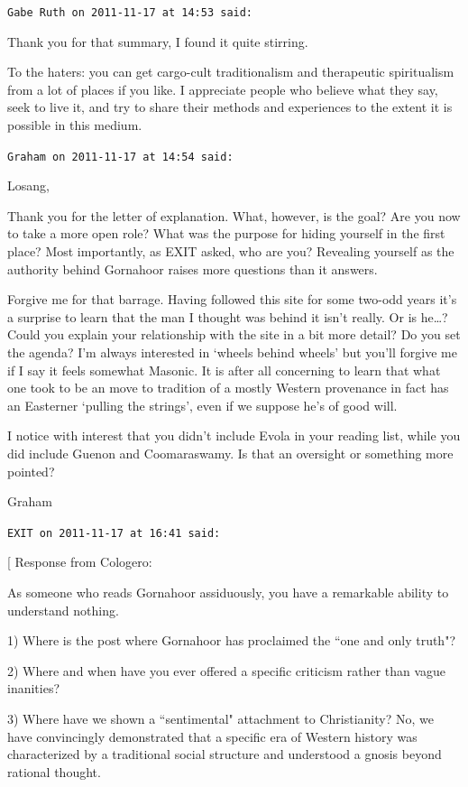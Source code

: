 \begin{footnotesize}
\begin{sffamily}
\hfill

\texttt{Gabe Ruth on 2011-11-17 at 14:53 said: }

Thank you for that summary, I found it quite stirring. 

To the haters: you can get cargo-cult traditionalism and therapeutic spiritualism from a lot of places if you like. I appreciate people who believe what they say, seek to live it, and try to share their methods and experiences to the extent it is possible in this medium.


\hfill

\texttt{Graham on 2011-11-17 at 14:54 said: }

Losang,

Thank you for the letter of explanation. What, however, is the goal? Are you now to take a more open role? What was the purpose for hiding yourself in the first place? Most importantly, as EXIT asked, who are you? Revealing yourself as the authority behind Gornahoor raises more questions than it answers.

Forgive me for that barrage. Having followed this site for some two-odd years it's a surprise to learn that the man I thought was behind it isn't really. Or is he…? Could you explain your relationship with the site in a bit more detail? Do you set the agenda? I'm always interested in `wheels behind wheels' but you'll forgive me if I say it feels somewhat Masonic. It is after all concerning to learn that what one took to be an move to tradition of a mostly Western provenance in fact has an Easterner `pulling the strings', even if we suppose he's of good will.

I notice with interest that you didn't include Evola in your reading list, while you did include Guenon and Coomaraswamy. Is that an oversight or something more pointed?

Graham


\hfill

\texttt{EXIT on 2011-11-17 at 16:41 said: }

[ Response from Cologero:

As someone who reads Gornahoor assiduously, you have a remarkable ability to understand nothing.

1) Where is the post where Gornahoor has proclaimed the ``one and only truth"?

2) Where and when have you ever offered a specific criticism rather than vague inanities?

3) Where have we shown a ``sentimental" attachment to Christianity? No, we have convincingly demonstrated that a specific era of Western history was characterized by a traditional social structure and understood a gnosis beyond rational thought.


\end{sffamily}
\end{footnotesize}
